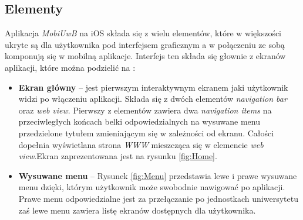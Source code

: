 \documentclass{iiuwb}
\begin{document}
\subsection{Elementy}
Aplikacja \textit{MobiUwB} na iOS składa się z wielu elementów, które w większości ukryte są dla użytkownika pod interfejsem graficznym a w połączeniu ze sobą komponują się w mobilną aplikacje. Interfejs ten składa się głownie z ekranów aplikacji, które można podzielić na :
\begin{itemize}
\item \textbf{Ekran główny} -- jest pierwszym interaktywnym ekranem jaki użytkownik widzi po włączeniu aplikacji. Składa się z dwóch elementów \textit{navigation bar} oraz \textit{web view}. Pierwszy z elementów zawiera dwa \textit{navigation items} na przeciwległych końcach belki odpowiedzialnych na wysuwane menu przedzielone tytułem zmieniającym się w zależności od ekranu. Całości dopełnia wyświetlana strona \textit{WWW} mieszcząca się w elemencie \textit{web view}.Ekran zaprezentowana jest na rysunku \ref{fig:Home}.
\item \textbf{Wysuwane menu} -- Rysunek \ref{fig:Menu} przedstawia lewe i prawe wysuwane menu dzięki, którym użytkownik może swobodnie nawigować po aplikacji. Prawe menu odpowiedzialne jest za przełączanie po jednostkach uniwersytetu zaś lewe menu zawiera listę ekranów dostępnych dla użytkownika.
\end{itemize}
\end{document}

